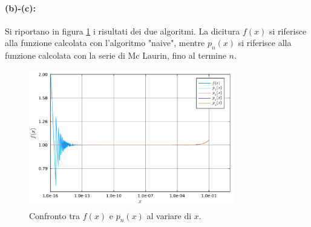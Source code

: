 \documentclass[letterpaper, 12pt]{article}
\numberwithin{equation}{section}    %
\begin{document}
\paragraph{(b)-(c):}Si riportano in figura \ref{fig:es1_4_2_1} i risultati dei due algoritmi. La dicitura $f(x)$ 
si riferisce alla funzione calcolata con l'algoritmo "naive", mentre $p_n(x)$ si riferisce alla funzione calcolata 
con la serie di Mc Laurin, fino al termine $n$.

\begin{figure}[!ht]
    \centering
    \includegraphics[width=0.8\textwidth]{1421.pdf}
    \caption{Confronto tra $f(x)$ e $p_n(x)$ al variare di $x$.}
    \label{fig:es1_4_2_1}
\end{figure}
\end{document}
